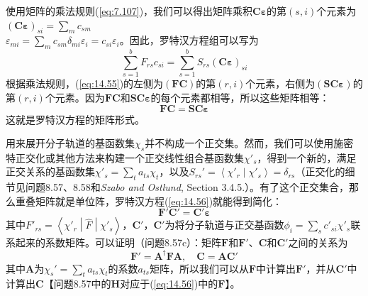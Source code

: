     使用矩阵的乘法规则(\ref{eq:7.107})，我们可以得出矩阵乘积$\mathbf{C}\symbf{\varepsilon}$的第$\left(s,i\right)$个元素为$\left(\mathbf{C}\symbf{\varepsilon}\right)_{si} = \sum_{m} c_{sm} $\\$\varepsilon_{mi} = \sum_m c_{sm} \delta_{mi} \varepsilon_i = c_{si} \varepsilon_i$。因此，罗特汉方程组可以写为
    \begin{equation}
        \sum_{s=1}^{b} F_{rs} c_{si} = \sum_{s=1}^{b} S_{rs} \left(\mathbf{C}\symbf{\varepsilon}\right)_{si}
        \label{eq:14.55}
    \end{equation}
    根据乘法规则，(\ref{eq:14.55})的左侧为$\left(\mathbf{FC}\right)$的第$\left(r,i\right)$个元素，右侧为$\left(\mathbf{SC}\symbf{\varepsilon}\right)$的第$\left(r,i\right)$个元素。因为$\mathbf{FC}$和$\mathbf{SC}\symbf{\varepsilon}$的每个元素都相等，所以这些矩阵相等：
    \begin{equation}
        \mathbf{FC} = \mathbf{SC}\symbf{\varepsilon}
        \label{eq:14.56}
    \end{equation}
    这就是罗特汉方程的矩阵形式。

    用来展开分子轨道的基函数集$\chi_s$并不构成一个正交集。然而，我们可以使用施密特正交化或其他方法来构建一个正交线性组合基函数集$\chi'_s$，得到一个新的，满足正交关系的基函数集$\chi'_s = \sum_t a_{ts} \chi_t$，以及$S_{rs}' = \left\langle \chi'_r \middle| \chi'_s \right\rangle = \delta_{rs}$（正交化的细节见问题8.57、8.58和\textit{Szabo and Ostlund}, Section 3.4.5.）。有了这个正交集合，那么重叠矩阵就是单位阵，罗特汉方程(\ref{eq:14.56})就能得到简化：
    \begin{equation}
        \mathbf{F'C'} = \mathbf{C'}\symbf{\varepsilon}
        \label{eq:14.57}
    \end{equation}
    其中$F'_{rs} = \left\langle \chi'_r \middle| \hat{F} \middle| \chi'_s \right\rangle$，$\mathbf{C'}$，$\mathbf{C'}$为将分子轨道与正交基函数$\phi_i = \sum_s c'_{si} \chi'_s$联系起来的系数矩阵。可以证明（问题8.57c）：矩阵$\mathbf{F}$和$\mathbf{F'}$、$\mathbf{C}$和$\mathbf{C'}$之间的关系为
    \begin{equation*}
        \mathbf{F'} = \mathbf{A}^{\dagger} \mathbf{FA}, \quad \mathbf{C} = \mathbf{A}\mathbf{C'}
    \end{equation*}
    其中$\mathbf{A}$为$\chi_s' = \sum_t a_{ts} \chi_t$的系数$a_{ts}$矩阵，所以我们可以从$\mathbf{F}$中计算出$\mathbf{F'}$，并从$\mathbf{C'}$中计算出$\mathbf{C}$【问题8.57中的$\mathbf{H}$对应于(\ref{eq:14.56})中的$\mathbf{F}$】。

